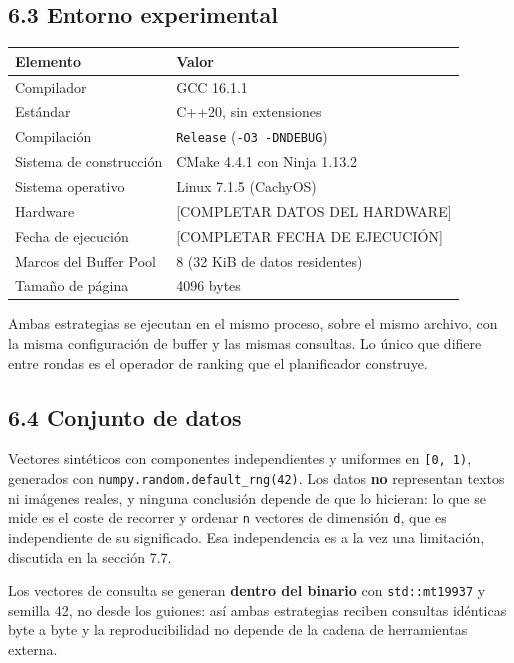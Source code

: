 \documentclass[11pt,a4paper]{article}
\let\pandocsubsection\subsection
\let\subsection\section
\let\subsubsection\pandocsubsection
\begin{document}
\subsubsection{6.3 Entorno experimental}\label{63-entorno-experimental}

\begin{longtable}[]{@{}ll@{}}
\toprule\noalign{}
Elemento & Valor \\
\midrule\noalign{}
\endhead
\bottomrule\noalign{}
\endlastfoot
Compilador & GCC 16.1.1 \\
Estándar & C++20, sin extensiones \\
Compilación & \texttt{Release} (\texttt{-O3\ -DNDEBUG}) \\
Sistema de construcción & CMake 4.4.1 con Ninja 1.13.2 \\
Sistema operativo & Linux 7.1.5 (CachyOS) \\
Hardware & {[}COMPLETAR DATOS DEL HARDWARE{]} \\
Fecha de ejecución & {[}COMPLETAR FECHA DE EJECUCIÓN{]} \\
Marcos del Buffer Pool & 8 (32 KiB de datos residentes) \\
Tamaño de página & 4096 bytes \\
\end{longtable}

Ambas estrategias se ejecutan en el mismo proceso, sobre el mismo
archivo, con la misma configuración de buffer y las mismas consultas. Lo
único que difiere entre rondas es el operador de ranking que el
planificador construye.

\subsubsection{6.4 Conjunto de datos}\label{64-conjunto-de-datos}

Vectores sintéticos con componentes independientes y uniformes en
\texttt{{[}0,\ 1)}, generados con
\texttt{numpy.random.default\_rng(42)}. Los datos \textbf{no}
representan textos ni imágenes reales, y ninguna conclusión depende de
que lo hicieran: lo que se mide es el coste de recorrer y ordenar
\texttt{n} vectores de dimensión \texttt{d}, que es independiente de su
significado. Esa independencia es a la vez una limitación, discutida en
la sección 7.7.

Los vectores de consulta se generan \textbf{dentro del binario} con
\texttt{std::mt19937} y semilla 42, no desde los guiones: así ambas
estrategias reciben consultas idénticas byte a byte y la
reproducibilidad no depende de la cadena de herramientas externa.
\end{document}

